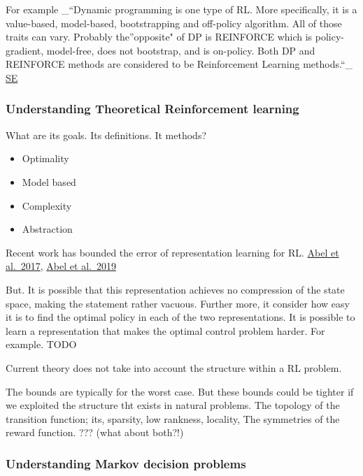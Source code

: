 For example \_``Dynamic programming is one type of RL. More
specifically, it is a value-based, model-based, bootstrapping and
off-policy algorithm. All of those traits can vary. Probably
the''opposite" of DP is REINFORCE which is policy-gradient, model-free,
does not bootstrap, and is on-policy. Both DP and REINFORCE methods are
considered to be Reinforcement Learning methods.``\_
\href{https://datascience.stackexchange.com/questions/38845/what-is-the-relationship-between-mdp-and-rl}{SE}

\hypertarget{understanding-theoretical-reinforcement-learning}{%
\subsubsection{Understanding Theoretical Reinforcement
learning}\label{understanding-theoretical-reinforcement-learning}}

What are its goals. Its definitions. It methods?

\begin{itemize}
\tightlist
\item
  Optimality
\item
  Model based
\item
  Complexity
\item
  Abstraction
\end{itemize}

Recent work has bounded the error of representation learning for RL.
\href{}{Abel et al.~2017}, \href{}{Abel et al.~2019}

But. It is possible that this representation achieves no compression of
the state space, making the statement rather vacuous. Further more, it
consider how easy it is to find the optimal policy in each of the two
representations. It is possible to learn a representation that makes the
optimal control problem harder. For example. TODO

Current theory does not take into account the structure within a RL
problem.

The bounds are typically for the worst case. But these bounds could be
tighter if we exploited the structure tht exists in natural problems.
The topology of the transition function; its, sparsity, low rankness,
locality, The symmetries of the reward function. ??? (what about both?!)

\hypertarget{understanding-markov-decision-problems}{%
\subsubsection{Understanding Markov decision
problems}\label{understanding-markov-decision-problems}}

